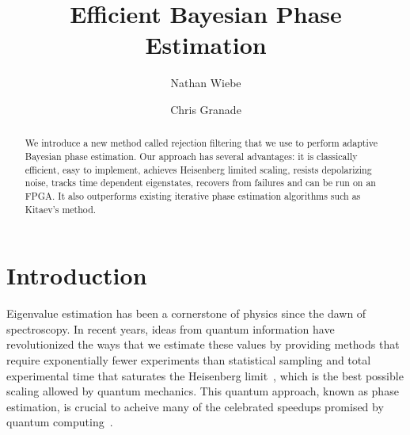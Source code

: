 \documentclass[aps,prl,amsmath,twocolumn,amssymb,superscriptaddress]{revtex4-1}
\begin{document}

\title{Efficient Bayesian Phase Estimation}
\author{Nathan Wiebe}

\author{Chris Granade}

\begin{abstract}
We introduce a new method called rejection filtering that we use to perform adaptive Bayesian phase estimation.  Our approach has several advantages: it is classically efficient, easy to implement, achieves Heisenberg limited scaling, resists depolarizing noise, tracks time dependent eigenstates, recovers from failures and can be run on an FPGA.  It also outperforms existing iterative phase estimation algorithms such as Kitaev's method.
\end{abstract}

\maketitle

\section{Introduction}
\label{sec:intro}

Eigenvalue estimation has been a cornerstone of physics since the dawn of spectroscopy.  In recent years, ideas from quantum information have revolutionized the ways that we estimate these values by providing methods that require exponentially fewer experiments than statistical sampling and total experimental time that saturates the Heisenberg limit~\cite{Kit96,berry_optimal_2000,kitaev2002classical,higgins2007entanglement,BHB+09,GTA+06,hentschel_machine_2010,SHF14}, which is the best possible scaling allowed by quantum mechanics.  This quantum approach, known as phase estimation, is crucial to acheive many of the celebrated speedups promised by quantum computing~\cite{shor_polynomial-time_1995,BHM+02,ADL+05,harrow2009quantum,lanyon2010towards}.
\end{document}
